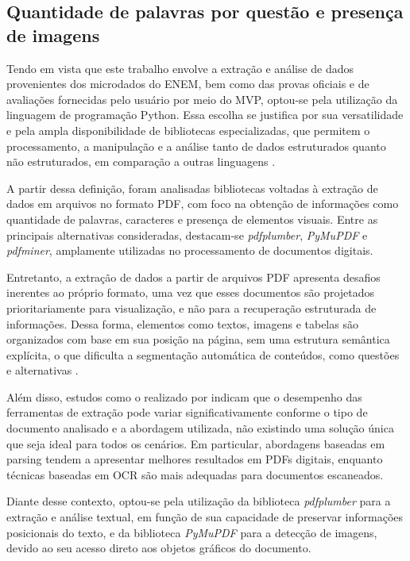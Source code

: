 \documentclass[a4paper,10pt, twocolumn]{article}
\begin{document}
\subsection{Quantidade de palavras por questão e presença de imagens} 
\label{sec:quantidade-palavras-imagens}

Tendo em vista que este trabalho envolve a extração e análise de dados provenientes dos microdados do ENEM, bem como das provas oficiais e de avaliações fornecidas pelo usuário por meio do MVP, optou-se pela utilização da linguagem de programação Python. Essa escolha se justifica por sua versatilidade e pela ampla disponibilidade de bibliotecas especializadas, que permitem o processamento, a manipulação e a análise tanto de dados estruturados quanto não estruturados, em comparação a outras linguagens \cite{UCD2024Python}.

A partir dessa definição, foram analisadas bibliotecas voltadas à extração de dados em arquivos no formato PDF, com foco na obtenção de informações como quantidade de palavras, caracteres e presença de elementos visuais. Entre as principais alternativas consideradas, destacam-se \textit{pdfplumber}, \textit{PyMuPDF} e \textit{pdfminer}, amplamente utilizadas no processamento de documentos digitais.

Entretanto, a extração de dados a partir de arquivos PDF apresenta desafios inerentes ao próprio formato, uma vez que esses documentos são projetados prioritariamente para visualização, e não para a recuperação estruturada de informações. Dessa forma, elementos como textos, imagens e tabelas são organizados com base em sua posição na página, sem uma estrutura semântica explícita, o que dificulta a segmentação automática de conteúdos, como questões e alternativas \cite{MetricCoders2025PDF}.

Além disso, estudos como o realizado por \textcite{Paudel2024PDFExtraction} indicam que o desempenho das ferramentas de extração pode variar significativamente conforme o tipo de documento analisado e a abordagem utilizada, não existindo uma solução única que seja ideal para todos os cenários. Em particular, abordagens baseadas em parsing tendem a apresentar melhores resultados em PDFs digitais, enquanto técnicas baseadas em OCR são mais adequadas para documentos escaneados.

Diante desse contexto, optou-se pela utilização da biblioteca \textit{pdfplumber} para a extração e análise textual, em função de sua capacidade de preservar informações posicionais do texto, e da biblioteca \textit{PyMuPDF} para a detecção de imagens, devido ao seu acesso direto aos objetos gráficos do documento.
\end{document}
